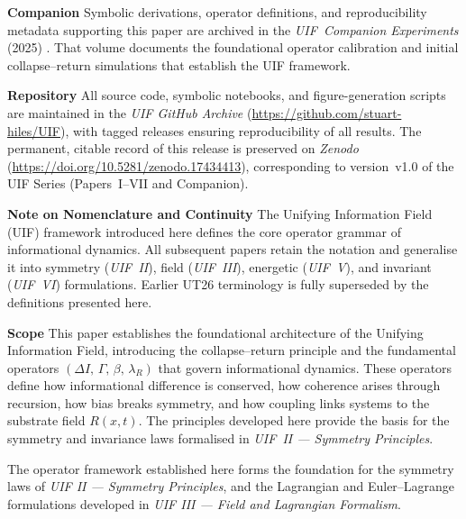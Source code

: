 \noindent\textbf{Companion}
\newline
Symbolic derivations, operator definitions, and reproducibility metadata
supporting this paper are archived in the
\textit{UIF~Companion Experiments} (2025) \cite{Companion2025}.
That volume documents the foundational operator calibration and initial
collapse–return simulations that establish the UIF framework.
\newline

\noindent\textbf{Repository}
\newline
All source code, symbolic notebooks, and figure-generation scripts are maintained in the
\textit{UIF GitHub Archive} (\url{https://github.com/stuart-hiles/UIF}),
with tagged releases ensuring reproducibility of all results.
The permanent, citable record of this release is preserved on \textit{Zenodo}
(\url{https://doi.org/10.5281/zenodo.17434413}), corresponding to
version~v1.0 of the UIF Series (Papers~I–VII and Companion).
\newline

\noindent\textbf{Note on Nomenclature and Continuity}
\newline
The Unifying Information Field (UIF) framework introduced here defines the core
operator grammar of informational dynamics.  All subsequent papers retain the
notation and generalise it into symmetry (\textit{UIF~II}),
field (\textit{UIF~III}), energetic (\textit{UIF~V}),
and invariant (\textit{UIF~VI}) formulations.  
Earlier UT26 terminology is fully superseded by the definitions presented here.
\newline

\noindent\textbf{Scope}
\newline
This paper establishes the foundational architecture of the Unifying Information Field,
introducing the collapse–return principle and the fundamental operators
$(\Delta I,\,\Gamma,\,\beta,\,\lambda_R)$ that govern informational dynamics.
These operators define how informational difference is conserved,
how coherence arises through recursion, how bias breaks symmetry,
and how coupling links systems to the substrate field $R(x,t)$.
The principles developed here provide the basis for the symmetry and invariance laws
formalised in \textit{UIF~II — Symmetry Principles}.

\noindent
The operator framework established here forms the foundation for the symmetry
laws of \textit{UIF II — Symmetry Principles}, and the Lagrangian and Euler–Lagrange
formulations developed in \textit{UIF III — Field and Lagrangian Formalism}.
\clearpage
{}
\setcounter{page}{1}
